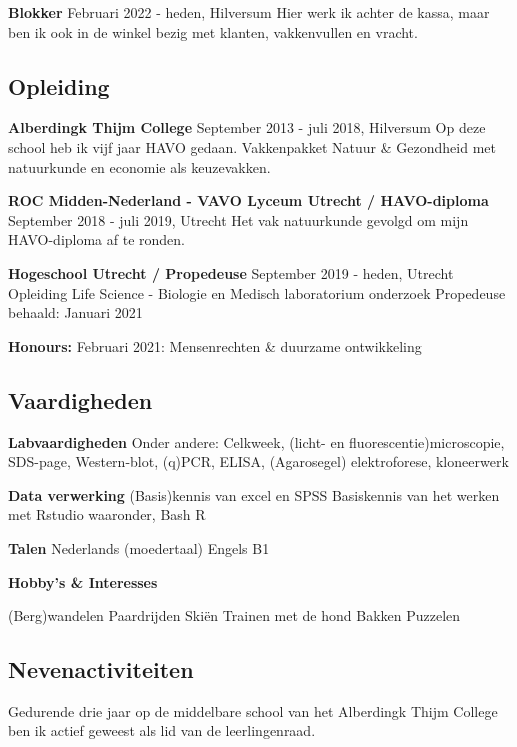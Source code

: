 \documentclass[
]{book}
\begin{document}
\textbf{Blokker}
Februari 2022 - heden, Hilversum
Hier werk ik achter de kassa, maar ben ik ook in de winkel bezig met klanten, vakkenvullen en vracht.

\hypertarget{opleiding}{%
\subsection*{Opleiding}\label{opleiding}}

\textbf{Alberdingk Thijm College}
September 2013 - juli 2018, Hilversum
Op deze school heb ik vijf jaar HAVO gedaan.
Vakkenpakket Natuur \& Gezondheid met natuurkunde en economie als keuzevakken.

\textbf{ROC Midden-Nederland - VAVO Lyceum Utrecht / HAVO-diploma}
September 2018 - juli 2019, Utrecht
Het vak natuurkunde gevolgd om mijn HAVO-diploma af te ronden.

\textbf{Hogeschool Utrecht / Propedeuse}
September 2019 - heden, Utrecht
Opleiding Life Science - Biologie en Medisch laboratorium onderzoek
Propedeuse behaald: Januari 2021

\textbf{Honours:}
Februari 2021: Mensenrechten \& duurzame ontwikkeling

\hypertarget{vaardigheden}{%
\subsection*{Vaardigheden}\label{vaardigheden}}

\textbf{Labvaardigheden}
Onder andere:
Celkweek, (licht- en fluorescentie)microscopie, SDS-page, Western-blot, (q)PCR, ELISA, (Agarosegel) elektroforese, kloneerwerk

\textbf{Data verwerking}
(Basis)kennis van excel en SPSS
Basiskennis van het werken met Rstudio waaronder,
Bash
R

\textbf{Talen}
Nederlands (moedertaal)
Engels B1

\textbf{Hobby's \& Interesses}

(Berg)wandelen
Paardrijden
Skiën
Trainen met de hond
Bakken
Puzzelen

\hypertarget{nevenactiviteiten}{%
\subsection*{Nevenactiviteiten}\label{nevenactiviteiten}}

Gedurende drie jaar op de middelbare school van het Alberdingk Thijm College ben ik actief geweest als lid van de leerlingenraad.
\end{document}
